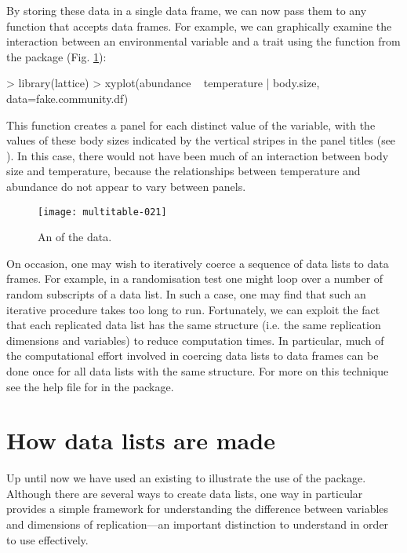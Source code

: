 \documentclass[a4paper]{report}
\numberwithin{exercise}{section}
\begin{document}
\begin{article}
By storing these data in a single data frame, we can now pass them to any function that accepts data frames.  For example, we can graphically examine the interaction between an environmental variable and a trait using the  function from the  package (Fig. \ref{fig:xyplot}):
\begin{Schunk}
\begin{Sinput}
> library(lattice)
> xyplot(abundance ~ temperature | body.size,
   data=fake.community.df)
\end{Sinput}
\end{Schunk}
This function creates a panel for each distinct value of the  variable, with the values of these body sizes indicated by the vertical stripes in the panel titles (see ).  In this case, there would not have been much of an interaction between body size and temperature, because the relationships between temperature and abundance do not appear to vary between panels.
\begin{figure}
\texttt{[image: multitable-021]}
\caption{An  of the  data.}
\label{fig:xyplot}
\end{figure}

On occasion, one may wish to iteratively coerce a sequence of data lists to data frames.  For example, in a randomisation test one might loop over a number of random subscripts of a data list.  In such a case, one may find that such an iterative procedure takes too long to run.  Fortunately, we can exploit the fact that each replicated data list has the same structure (i.e. the same replication dimensions and variables) to reduce computation times.  In particular, much of the computational effort involved in coercing data lists to data frames can be done once for all data lists with the same structure.  For more on this technique see the help file for  in the  package.

\section{How data lists are made}

Up until now we have used an existing  to illustrate the use of the  package.  Although there are several ways to create data lists, one way in particular provides a simple framework for understanding the difference between variables and dimensions of replication---an important distinction to understand in order to use  effectively.


\end{article}
\end{document}
